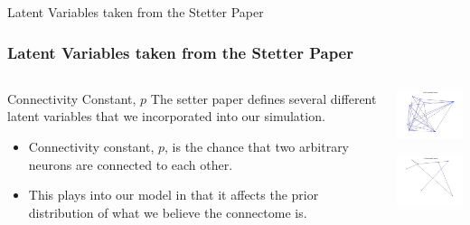 \documentclass{beamer}
\begin{document}
\begin{frame}{Latent Variables taken from the Stetter Paper}
\frametitle{Latent Variables taken from the Stetter Paper}
 \begin{columns}[T]
    \begin{column}{.5\textwidth}
   
\begin{block}{Connectivity Constant, $p$}
	The setter paper defines several different latent variables that we incorporated into our simulation. 
	\begin{itemize}
	\item Connectivity constant, $p$, is the chance that two arbitrary neurons are connected to each other. 
	\item This plays into our model in that it affects the prior distribution of what we believe the connectome is. 
	\end{itemize} 

   \end{block}





  
\end{column}
    \begin{column}{36mm}
    \begin{block}{}
    \includegraphics[width=36mm]{high_connectivity_constant.jpg}
   
    \end{block}
    \begin{block}{}
     \includegraphics[width=36mm]{low_connectivity_constant.jpg}
     \end{block}
    \end{column}
\end{columns} 


\end{frame}
 
 
 
\end{document}
